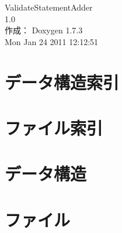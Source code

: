 \documentclass[a4paper]{book}
\begin{document}
\begin{titlepage}
\vspace*{7cm}
\begin{center}
{\Large ValidateStatementAdder \\[1ex]\large 1.0 }\\
\vspace*{1cm}
{\large 作成： Doxygen 1.7.3}\\
\vspace*{0.5cm}
{\small Mon Jan 24 2011 12:12:51}\\
\end{center}
\end{titlepage}
\clearemptydoublepage
{}
\tableofcontents
\clearemptydoublepage
{}
\chapter{データ構造索引}

\chapter{ファイル索引}

\chapter{データ構造}















\chapter{ファイル}


































\printindex
\end{document}
